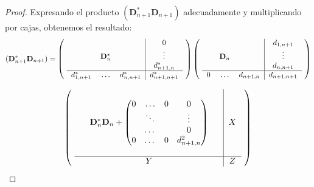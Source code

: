 \begin{proof} Expresando el producto $(\mathbf{D}_{n+1}^{*}\mathbf{D}_{n+1})$ adecuadamente y multiplicando por cajas, obtenemos el resultado:
	\[ (\mathbf{D}_{n+1}^{*}\mathbf{D}_{n+1}) =
		\left (   \mbox{
			\begin{tabular}{ccc|c}
				              & $$                   &               & $0$             \\
				$$            & $\mathbf{D}_{n}^{*}$ &               & $\vdots$        \\
				              &                      &               & $d_{n+1,n}^*$   \\  \hline

				$d_{1,n+1}^*$ & $\ldots$             & $d_{n,n+1}^*$ & $d_{n+1,n+1}^*$ \\
			\end{tabular}
		} \right ) \left (   \mbox{
			\begin{tabular}{ccc|c}
				    & $$               &             & $d_{1,n+1}$   \\
				$$  & $\mathbf{D}_{n}$ &             & $\vdots$      \\
				    &                  &             & $d_{n,n+1}$   \\  \hline

				$0$ & $\ldots$         & $d_{n+1,n}$ & $d_{n+1,n+1}$ \\
			\end{tabular}
		} \right )
	\]

	\[
		\left (   \mbox{
			\begin{tabular}{ccc|c}
				   & $$                                                &    &       \\
				$$ & $\mathbf{D}_{n}^{*}\mathbf{D}_{n}+\begin{pmatrix}
						                                       0 & \ldots & 0 & 0           \\
						                                         & \ddots &   & \vdots      \\
						                                         & \dots  &   & 0           \\
						                                       0 & \dots  & 0 & d_{n+1,n}^2
					                                       \end{pmatrix}$ &    & $X$ \\
				   &                                                   &    & $$    \\  \hline

				$$ & $Y$                                               & $$ & $Z$   \\
			\end{tabular}
		} \right )
	\]
\end{proof}

